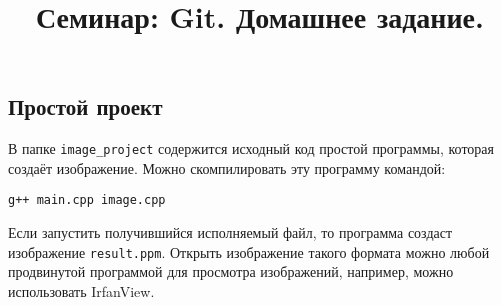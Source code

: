 \documentclass{article}
\begin{document}
\title{Семинар: Git. Домашнее задание.\vspace{-5ex}}\date{}\maketitle
\subsection{Простой проект}
В папке \texttt{image\_project} содержится исходный код простой программы, которая создаёт изображение.
Можно скомпилировать эту программу командой:
\begin{verbatim}
g++ main.cpp image.cpp
\end{verbatim}
Если запустить получившийся исполняемый файл, то программа создаст изображение \texttt{result.ppm}.
Открыть изображение такого формата можно любой продвинутой программой для просмотра изображений, например, можно использовать IrfanView.
\end{document}
